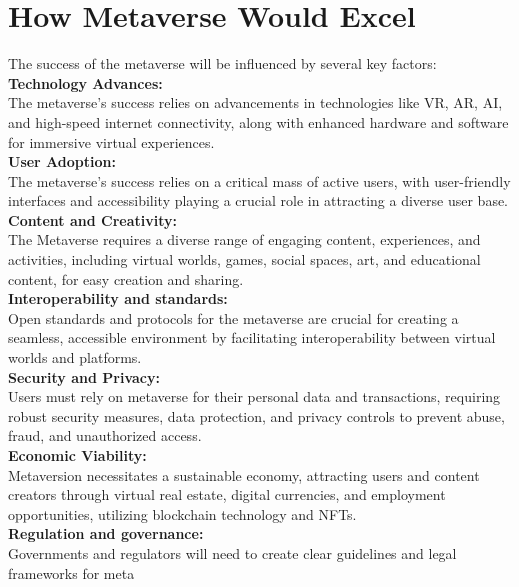 \section{How Metaverse Would Excel}
The success of the metaverse will be influenced by several key factors:\\
\textbf{Technology Advances:}\\ The metaverse's success relies on advancements in technologies like VR, AR, AI, and high-speed internet connectivity, along with enhanced hardware and software for immersive virtual experiences.\\
\textbf{User Adoption:}\\ The metaverse's success relies on a critical mass of active users, with user-friendly interfaces and accessibility playing a crucial role in attracting a diverse user base.\\
\textbf{Content and Creativity:}\\ The Metaverse requires a diverse range of engaging content, experiences, and activities, including virtual worlds, games, social spaces, art, and educational content, for easy creation and sharing.\\
\textbf{Interoperability and standards:}\\ Open standards and protocols for the metaverse are crucial for creating a seamless, accessible environment by facilitating interoperability between virtual worlds and platforms.\\
\textbf{Security and Privacy:}\\ Users must rely on metaverse for their personal data and transactions, requiring robust security measures, data protection, and privacy controls to prevent abuse, fraud, and unauthorized access.\\
\textbf{Economic Viability:}\\ Metaversion necessitates a sustainable economy, attracting users and content creators through virtual real estate, digital currencies, and employment opportunities, utilizing blockchain technology and NFTs.\\
\textbf{Regulation and governance:}\\ Governments and regulators will need to create clear guidelines and legal frameworks for meta
